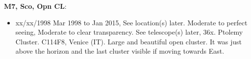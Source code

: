 {\bf M7, Sco, Opn CL}:
\begin{itemize}
\item xx/xx/1998 Mar 1998 to Jan 2015, See location(s) later. Moderate to perfect seeing, Moderate to clear transparency. See telescope(s) later, 36x. Ptolemy Cluster. C114F8, Venice (IT). Large and beautiful open cluster. It was just above the horizon and the last cluster visible if moving towards East.
\end{itemize}
